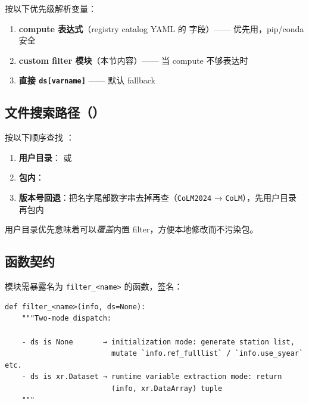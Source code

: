  按以下优先级解析变量：

\begin{enumerate}
  \item \textbf{compute 表达式}（registry catalog YAML 的  字段）—— 优先用，pip/conda 安全
  \item \textbf{custom filter 模块}（本节内容）—— 当 compute 不够表达时
  \item \textbf{直接 \texttt{ds[varname]}} —— 默认 fallback
\end{enumerate}


\subsection{文件搜索路径（）}

 按以下顺序查找 ：

\begin{enumerate}
  \item \textbf{用户目录}： 或 
  \item \textbf{包内}：
  \item \textbf{版本号回退}：把名字尾部数字串去掉再查（\texttt{CoLM2024} → \texttt{CoLM}），先用户目录再包内
\end{enumerate}

用户目录优先意味着可以\emph{覆盖}内置 filter，方便本地修改而不污染包。

\subsection{函数契约}

模块需暴露名为 \texttt{filter\_<name>} 的函数，签名：

\begin{verbatim}
def filter_<name>(info, ds=None):
    """Two-mode dispatch:

    - ds is None       → initialization mode: generate station list,
                         mutate `info.ref_fulllist` / `info.use_syear` etc.
    - ds is xr.Dataset → runtime variable extraction mode: return
                         (info, xr.DataArray) tuple
    """
\end{verbatim}

